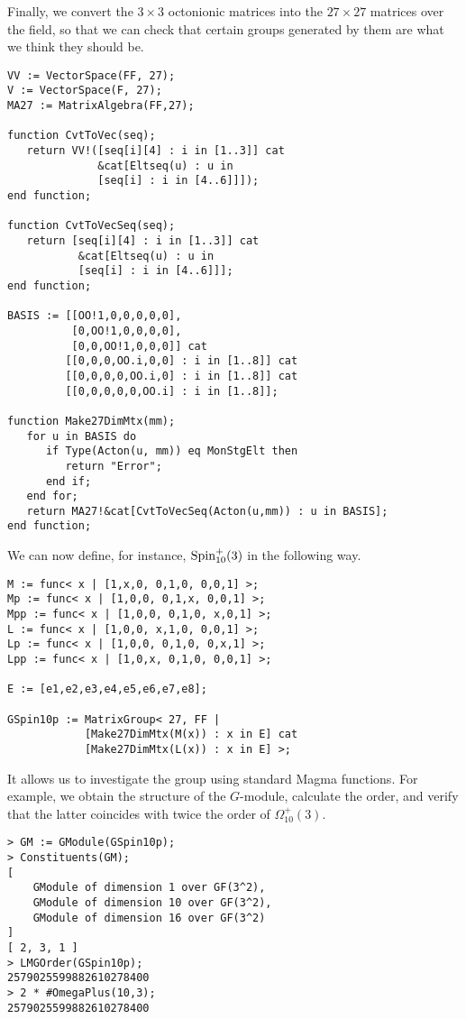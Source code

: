 Finally, we convert the $3\times 3$ octonionic
matrices into the
$27 \times 27$ matrices over the field, 
so that we can check
that certain groups generated by them are
what we think they should be.
\begin{verbatim}
VV := VectorSpace(FF, 27);
V := VectorSpace(F, 27);
MA27 := MatrixAlgebra(FF,27);

function CvtToVec(seq);
   return VV!([seq[i][4] : i in [1..3]] cat
              &cat[Eltseq(u) : u in 
              [seq[i] : i in [4..6]]]);
end function;

function CvtToVecSeq(seq);
   return [seq[i][4] : i in [1..3]] cat 
           &cat[Eltseq(u) : u in 
           [seq[i] : i in [4..6]]];
end function;

BASIS := [[OO!1,0,0,0,0,0], 
          [0,OO!1,0,0,0,0], 
          [0,0,OO!1,0,0,0]] cat 
         [[0,0,0,OO.i,0,0] : i in [1..8]] cat
         [[0,0,0,0,OO.i,0] : i in [1..8]] cat
         [[0,0,0,0,0,OO.i] : i in [1..8]];

function Make27DimMtx(mm);
   for u in BASIS do
      if Type(Acton(u, mm)) eq MonStgElt then
         return "Error";
      end if;
   end for;
   return MA27!&cat[CvtToVecSeq(Acton(u,mm)) : u in BASIS];
end function;
\end{verbatim}
We can now define, for instance, $\mathrm{Spin}_{10}^+(3)$ in the following way.
\begin{verbatim}
M := func< x | [1,x,0, 0,1,0, 0,0,1] >;
Mp := func< x | [1,0,0, 0,1,x, 0,0,1] >;
Mpp := func< x | [1,0,0, 0,1,0, x,0,1] >;
L := func< x | [1,0,0, x,1,0, 0,0,1] >;
Lp := func< x | [1,0,0, 0,1,0, 0,x,1] >;
Lpp := func< x | [1,0,x, 0,1,0, 0,0,1] >; 

E := [e1,e2,e3,e4,e5,e6,e7,e8];

GSpin10p := MatrixGroup< 27, FF | 
            [Make27DimMtx(M(x)) : x in E] cat
            [Make27DimMtx(L(x)) : x in E] >;
\end{verbatim}
It allows us to investigate the group using 
standard Magma functions. For example, 
we obtain the structure of the $G$-module, 
calculate the order, and verify that the latter
coincides with twice the order of
$\Omega_{10}^+(3)$.
\begin{verbatim}
> GM := GModule(GSpin10p);
> Constituents(GM);
[
    GModule of dimension 1 over GF(3^2),
    GModule of dimension 10 over GF(3^2),
    GModule of dimension 16 over GF(3^2)
]
[ 2, 3, 1 ]
> LMGOrder(GSpin10p);
2579025599882610278400
> 2 * #OmegaPlus(10,3);  
2579025599882610278400
\end{verbatim}

